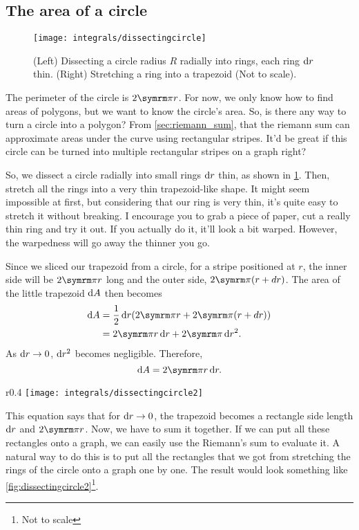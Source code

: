 \subsection{The area of a circle}
\begin{figure}[t]
    \centering
    \texttt{[image: integrals/dissectingcircle]}
    \caption{(Left) Dissecting a circle radius $R$ radially into rings, each ring $\odif{r}$ thin. (Right) Stretching a ring into a trapezoid (Not to scale).}
    \label{fig:dissectingcircle}
\end{figure}

The perimeter of the circle is $2\cpi r$. For now, we only know how to find areas of polygons, but we want to know the circle's area. So, is there any way to turn a circle into a polygon? From \cref{sec:riemann_sum}, that the riemann sum can approximate areas under the curve using rectangular stripes. It'd be great if this circle can be turned into multiple rectangular stripes on a graph right?

So, we dissect a circle radially into small rings $\odif{r}$ thin, as shown in \cref{fig:dissectingcircle}. Then, stretch all the rings into a very thin trapezoid-like shape. It might seem impossible at first, but considering that our ring is very thin, it's quite easy to stretch it without breaking. I encourage you to grab a piece of paper, cut a really thin ring and try it out. If you actually do it, it'll look a bit warped. However, the warpedness will go away the thinner you go.

Since we sliced our trapezoid from a circle, for a stripe positioned at $r$, the inner side will be $2\cpi r$ long and the outer side, $2\cpi (r + dr)$. The area of the little trapezoid $\odif{A}$ then becomes
\begin{align*}
    \odif{A} &= \frac{1}{2}\odif{r}(2\cpi r + 2\cpi (r + dr)) \\
    &= 2\cpi r\odif{r} + 2\cpi\odif{r}^2. 
\end{align*}
As $\odif{r} \appr 0$, $\odif{r}^2$ becomes negligible. Therefore,
\begin{equation}
    \odif{A} = 2\cpi r \odif{r}.
\end{equation}
\begin{wrapfigure}[17]{r}{0.4\textwidth}
    \centering
    \texttt{[image: integrals/dissectingcircle2]}
    \caption{Rearranging all the approximated rectangles onto a graph (Not to scale).}
    \label{fig:dissectingcircle2}
\end{wrapfigure}
This equation says that for $\odif{r} \appr 0$, the trapezoid becomes a rectangle side length $\odif{r}$ and $2\cpi r$. Now, we have to sum it together. If we can put all these rectangles onto a graph, we can easily use the Riemann's sum to evaluate it. A natural way to do this is to put all the rectangles that we got from stretching the rings of the circle onto a graph one by one. The result would look something like \cref{fig:dissectingcircle2}\footnote{Not to scale}.

